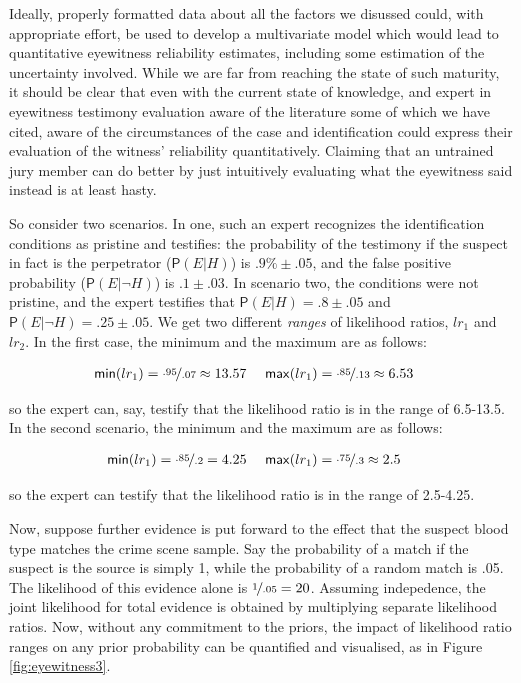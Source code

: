 \documentclass[10pt,dvipsnames,enabledeprecatedfontcommands]{scrartcl}
\newcommand{\n}{\neg}
\newcommand{\pr}[1]{\mathsf{P}(#1)}
\begin{document}
Ideally, properly formatted data about all the factors we disussed
could, with appropriate effort, be used to develop a multivariate model
which would lead to quantitative eyewitness reliability estimates,
including some estimation of the uncertainty involved. While we are far
from reaching the state of such maturity, it should be clear that even
with the current state of knowledge, and expert in eyewitness testimony
evaluation aware of the literature some of which we have cited, aware of
the circumstances of the case and identification could express their
evaluation of the witness' reliability quantitatively. Claiming that an
untrained jury member can do better by just intuitively evaluating what
the eyewitness said instead is at least hasty.

So consider two scenarios. In one, such an expert recognizes the
identification conditions as pristine and testifies: the probability of
the testimony if the suspect in fact is the perpetrator
(\(\pr{E\vert H}\)) is \(.9\% \pm .05\), and the false positive
probability (\(\pr{E \vert \n H}\)) is \(.1\pm .03\). In scenario two,
the conditions were not pristine, and the expert testifies that
\(\pr{E\vert H}=.8 \pm .05\) and \(\pr{E\vert \n H}=.25 \pm .05\). We
get two different \emph{ranges} of likelihood ratios, \(lr_1\) and
\(lr_2\). In the first case, the minimum and the maximum are as follows:

\begin{align*}
\mathsf{min}(lr_1) = \nicefrac{.95}{.07} \approx 13.57  & \,\,\,\,\,\,\,\,  \mathsf{max}(lr_1) = \nicefrac{.85}{.13} \approx 6.53  
\end{align*}

\noindent so the expert can, say, testify that the likelihood ratio is
in the range of 6.5-13.5. In the second scenario, the minimum and the
maximum are as follows:

\begin{align*}
\mathsf{min}(lr_1) = \nicefrac{.85}{.2} =  4.25 &  \,\,\,\,\,\,\,\,   \mathsf{max}(lr_1) = \nicefrac{.75}{.3} \approx 2.5  
\end{align*}

\noindent so the expert can testify that the likelihood ratio is in the
range of 2.5-4.25.

Now, suppose further evidence is put forward to the effect that the
suspect blood type matches the crime scene sample. Say the probability
of a match if the suspect is the source is simply 1, while the
probability of a random match is .05. The likelihood of this evidence
alone is \(\nicefrac{1}{.05}= 20\). Assuming indepedence, the joint
likelihood for total evidence is obtained by multiplying separate
likelihood ratios. Now, without any commitment to the priors, the impact
of likelihood ratio ranges on any prior probability can be quantified
and visualised, as in Figure \ref{fig:eyewitness3}.
\end{document}
